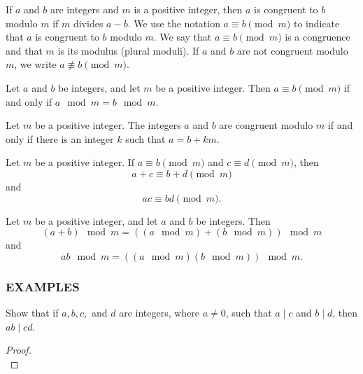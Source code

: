 \begin{defn}[modulo]
If \(a\) and \(b\) are integers and \(m\) is a positive integer, then \(a\) is congruent to \(b\) modulo \(m\) if \(m\) divides \(a - b\). We use the notation \(a \equiv b \pmod{m}\) to indicate that \(a\) is congruent to \(b\) modulo \(m\). We say that \(a \equiv b \pmod{m}\) is a congruence and that \(m\) is its modulus (plural moduli). If \(a\) and \(b\) are not congruent modulo \(m\), we write \(a \not\equiv b \pmod{m}\).


\end{defn}
\begin{thm}
Let \(a\) and \(b\) be integers, and let \(m\) be a positive integer. Then \(a \equiv b \pmod{m}\) if and only if \(a \mod m = b \mod m\).

\end{thm}
\begin{thm}
Let \(m\) be a positive integer. The integers \(a\) and \(b\) are congruent modulo \(m\) if and only if there is an integer \(k\) such that \(a = b + km\).


\end{thm}
\begin{thm}
Let \(m\) be a positive integer. If \(a \equiv b \pmod{m}\) and \(c \equiv d \pmod{m}\), then
\[a + c \equiv b + d \pmod{m}\] and \[ac \equiv bd \pmod{m}.\]

\end{thm}
\begin{thm}
Let \(m\) be a positive integer, and let \(a\) and \(b\) be integers. Then
\[(a + b) \mod m = ((a \mod m) + (b \mod m)) \mod m\]
and
\[ab \mod m = ((a \mod m)(b \mod m)) \mod m.\]

\end{thm}
\newpage
\subsubsection{EXAMPLES}
\begin{exmp}
Show that if \(a, b, c, \) and \(d\) are integers, where \(a \neq 0\), such that \(a \mid c\) and \(b \mid d\), then \(ab \mid cd\).
\begin{proof}$ $\\

\vspace{2cm}
\end{proof}
\end{exmp}

